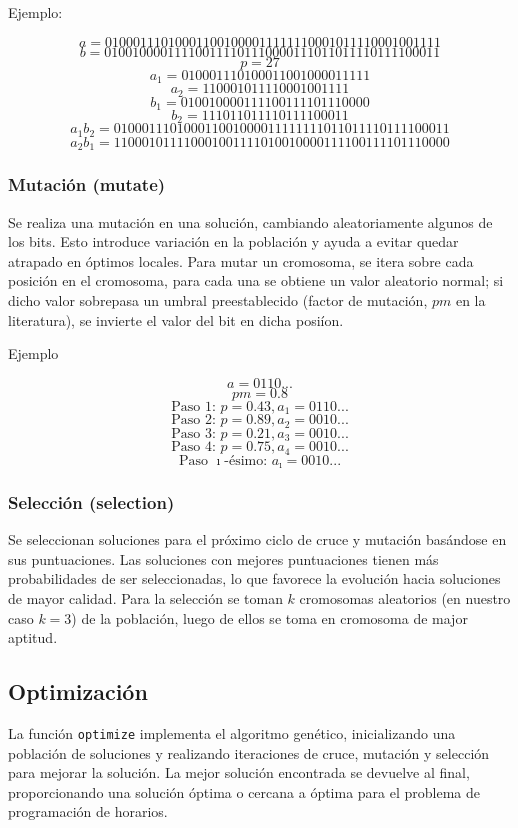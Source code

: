 \documentclass{article}
\begin{document}
Ejemplo:

\[a = 010001110100011001000011111110001011110001001111\]
\[b = 010010000111100111101110000111011011110111100011\]
\[p = 27\]
\[a_{1} = 010001110100011001000011111\]
\[a_{2} = 110001011110001001111\]
\[b_{1} = 010010000111100111101110000\]
\[b_{2} = 111011011110111100011\]
\[a_{1}b_{2} = 010001110100011001000011111111011011110111100011\]
\[a_{2}b_{1} = 110001011110001001111010010000111100111101110000\]

\subsubsection{Mutación (mutate)}

Se realiza una mutación en una solución, cambiando aleatoriamente algunos de los bits. Esto introduce variación en la población y ayuda a evitar quedar atrapado en óptimos locales.
Para mutar un cromosoma, se itera sobre cada posici\'on en el cromosoma, para cada una se obtiene un valor aleatorio normal; si dicho valor sobrepasa un umbral preestablecido (factor de mutaci\'on, \(pm\) en la literatura), se invierte el valor del bit en dicha posi\'ion.

Ejemplo

\[a = 0110 ...\]
\[pm = 0.8\]
\[\text{Paso 1: } p = 0.43, a_{1} = 0110 ...\]
\[\text{Paso 2: } p = 0.89, a_{2} = 0010 ...\]
\[\text{Paso 3: } p = 0.21, a_{3} = 0010 ...\]
\[\text{Paso 4: } p = 0.75, a_{4} = 0010 ...\]
\[\text{Paso }\imath\text{-\'esimo: } a_{\imath} = 0010 ...\]

\subsubsection{Selección (selection)}

Se seleccionan soluciones para el próximo ciclo de cruce y mutación basándose en sus puntuaciones. Las soluciones con mejores puntuaciones tienen más probabilidades de ser seleccionadas, lo que favorece la evolución hacia soluciones de mayor calidad.
Para la selecci\'on se toman \(k\) cromosomas aleatorios (en nuestro caso \(k = 3\)) de la poblaci\'on, luego de ellos se toma en cromosoma de major aptitud. 

\subsection{Optimización}

La función \texttt{optimize} implementa el algoritmo genético, inicializando una población de soluciones y realizando iteraciones de cruce, mutación y selección para mejorar la solución. La mejor solución encontrada se devuelve al final, proporcionando una solución óptima o cercana a óptima para el problema de programación de horarios.
\end{document}
